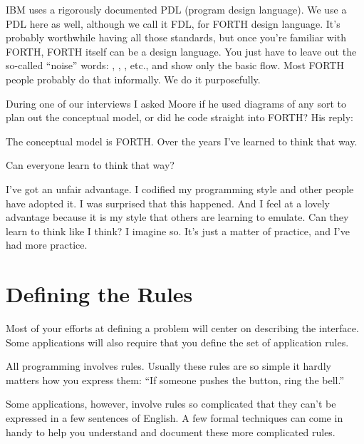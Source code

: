\begin{tfquot}
\noindent IBM uses a rigorously documented PDL (program design
language). We use a PDL here as well, although we call it FDL, for
FORTH design language. It's probably worthwhile having all those
standards, but once you're familiar with FORTH, FORTH itself can be a
design language. You just have to leave out the so-called ``noise''
words: , , , etc., and show only the
basic flow. Most FORTH people probably do that informally. We do it
purposefully.

\end{tfquot}
\blackline{1ex}


\noindent During one of our interviews I asked Moore if he used
diagrams of any sort to plan out the conceptual model, or did he code
straight into FORTH? His reply:

\begin{tfquot}
\noindent The conceptual model is FORTH. Over the years I've learned to think that way.
\end{tfquot}

\noindent Can everyone learn to think that way?

\begin{tfquot}
\noindent I've got an unfair advantage. I codified my programming style and other
people have adopted it. I was surprised that this happened. And I feel at a
lovely advantage because it is my style that others are learning to emulate.
Can they learn to think like I think? I imagine so. It's just a matter of
practice, and I've had more practice.
\end{tfquot}
\blackline{2ex}

\section{Defining the Rules}

\noindent Most of your efforts at defining a problem will center on describing the
interface. Some applications will also require that you define the set of
application rules.

All programming involves rules. Usually these rules are so simple it
hardly matters how you express them: ``If someone pushes the button,
ring the bell.''

Some applications, however, involve rules so complicated that they
can't be expressed in a few sentences of English. A few formal techniques
can come in handy to help you understand and document these more
complicated rules.

